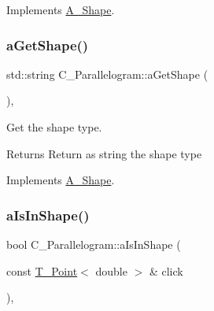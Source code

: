 Implements \hyperlink{classA__Shape_a1b202256a4e5dcb0edab4ab93a37122c}{A\+\_\+\+Shape}.

\mbox{\label{classC__Parallelogram_a373fdd3ebdfeffcaa0a72ff7001af8ec}} 
\subsubsection{\texorpdfstring{a\+Get\+Shape()}{aGetShape()}\hspace{0.1cm}{\footnotesize\ttfamily [2/2]}}
{\footnotesize\ttfamily std\+::string C\+\_\+\+Parallelogram\+::a\+Get\+Shape (\begin{DoxyParamCaption}{ }\end{DoxyParamCaption})\hspace{0.3cm}{\ttfamily [override]}, {\ttfamily [virtual]}}



Get the shape type. 

\begin{DoxyReturn}{Returns}
Return as string the shape type 
\end{DoxyReturn}


Implements \hyperlink{classA__Shape_a1b202256a4e5dcb0edab4ab93a37122c}{A\+\_\+\+Shape}.

\mbox{\label{classC__Parallelogram_a9ccee396c30606bfe64df416c22586d5}} 
\subsubsection{\texorpdfstring{a\+Is\+In\+Shape()}{aIsInShape()}\hspace{0.1cm}{\footnotesize\ttfamily [1/2]}}
{\footnotesize\ttfamily bool C\+\_\+\+Parallelogram\+::a\+Is\+In\+Shape (\begin{DoxyParamCaption}\item[{const \hyperlink{classT__Point}{T\+\_\+\+Point}$<$ double $>$ \&}]{click }\end{DoxyParamCaption})\hspace{0.3cm}{\ttfamily [override]}, {\ttfamily [virtual]}}



